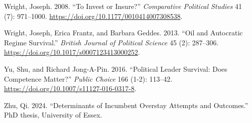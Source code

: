 \documentclass[
  12pt,
]{report}
\newlength{\cslhangindent}
\newenvironment{CSLReferences}[2] %
 {\begin{list}{}{%
  \setlength{\itemindent}{0pt}
  \setlength{\leftmargin}{0pt}
  \setlength{\parsep}{0pt}
  \ifodd #1
   \setlength{\leftmargin}{\cslhangindent}
   \setlength{\itemindent}{-1\cslhangindent}
  \fi
  \setlength{\itemsep}{#2\baselineskip}}}
 {\end{list}}
\begin{document}
\begin{CSLReferences}{1}{0}
Wright, Joseph. 2008. {``To Invest or Insure?''} \emph{Comparative
Political Studies} 41 (7): 971--1000.
\url{https://doi.org/10.1177/0010414007308538}.

Wright, Joseph, Erica Frantz, and Barbara Geddes. 2013. {``Oil and
Autocratic Regime Survival.''} \emph{British Journal of Political
Science} 45 (2): 287--306.
\url{https://doi.org/10.1017/s0007123413000252}.

Yu, Shu, and Richard Jong-A-Pin. 2016. {``Political Leader Survival:
Does Competence Matter?''} \emph{Public Choice} 166 (1-2): 113--42.
\url{https://doi.org/10.1007/s11127-016-0317-8}.

Zhu, Qi. 2024. {``Determinants of Incumbent Overstay Attempts and
Outcomes.''} PhD thesis, University of Essex.

\end{CSLReferences}
\end{document}
